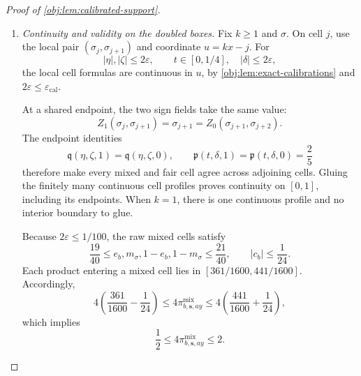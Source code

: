 \documentclass[11pt]{article}
\begin{document}
\begin{proof}[Proof of \cref{obj:lem:calibrated-support}]
\begin{enumerate}
Combining these estimates with the preceding linear estimates proves, for both mixed branches,
\[
\begin{aligned}
|g(P_{b,\sigma},x)-g(P_{b,\sigma},z)|
&\le k^{1-\alpha}|x-z|,&
|g(P_{b,\sigma},x)-g(P_{b,\sigma},z)|
&\le2k^{-\alpha},\\
|\nu(P_{b,\sigma},x)-\nu(P_{b,\sigma},z)|
&\le k^{1-\beta}|x-z|,&
|\nu(P_{b,\sigma},x)-\nu(P_{b,\sigma},z)|
&\le2k^{-\beta}.
\end{aligned}
\]

\item \textit{Continuity and validity on the doubled boxes.}
Fix \(k\ge1\) and \(\sigma\). On cell \(j\), use the local pair
\((\sigma_j,\sigma_{j+1})\) and coordinate \(u=kx-j\).
For
\[
|\eta|,|\zeta|\le2\varepsilon,
\qquad
t\in[0,1/4],\quad |\delta|\le2\varepsilon,
\]
the local cell formulas are continuous in \(u\), by
\cref{obj:lem:exact-calibrations} and
\(2\varepsilon\le\varepsilon_{\mathrm{cal}}\).

At a shared endpoint, the two sign fields take the same value:
\[
Z_1(\sigma_j,\sigma_{j+1})
=\sigma_{j+1}
=Z_0(\sigma_{j+1},\sigma_{j+2}).
\]
The endpoint identities
\[
\mathfrak q(\eta,\zeta,1)=\mathfrak q(\eta,\zeta,0),
\qquad
\mathfrak p(t,\delta,1)=\mathfrak p(t,\delta,0)=\frac25
\]
therefore make every mixed and fair cell agree across adjoining cells. Gluing the finitely many continuous cell profiles proves continuity on \([0,1]\), including its endpoints. When \(k=1\), there is one continuous profile and no interior boundary to glue.

Because \(2\varepsilon\le1/100\), the raw mixed cells satisfy
\[
\frac{19}{40}\le e_b,m_\sigma,1-e_b,1-m_\sigma\le\frac{21}{40},
\qquad |c_b|\le\frac1{24}.
\]
Each product entering a mixed cell lies in
\([361/1600,441/1600]\). Accordingly,
\[
4\left(\frac{361}{1600}-\frac1{24}\right)
\le4\pi^{\mathrm{mix}}_{b,\mathbf s,ay}
\le4\left(\frac{441}{1600}+\frac1{24}\right),
\]
which implies
\[
\frac12\le4\pi^{\mathrm{mix}}_{b,\mathbf s,ay}\le2.
\]


\end{enumerate}
\end{proof}
\end{document}
